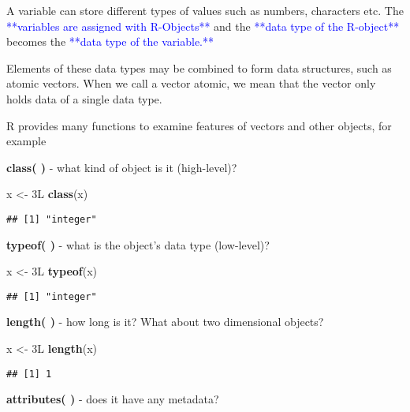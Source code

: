 \documentclass[
]{article}
\newenvironment{Shaded}{\begin{snugshade}}{\end{snugshade}}
\newcommand{\FunctionTok}[1]{\textcolor[rgb]{0.13,0.29,0.53}{\textbf{#1}}}
\newcommand{\NormalTok}[1]{#1}
\newcommand{\OtherTok}[1]{\textcolor[rgb]{0.56,0.35,0.01}{#1}}
\begin{document}
A variable can store different types of values such as numbers,
characters etc. The
\textcolor{blue}{**variables are assigned with R-Objects**} and the
\textcolor{blue}{**data type of the R-object**} becomes the
\textcolor{blue}{**data type of the variable.**}

Elements of these data types may be combined to form data structures,
such as atomic vectors. When we call a vector atomic, we mean that the
vector only holds data of a single data type.

R provides many functions to examine features of vectors and other
objects, for example

\textbf{class( )} - what kind of object is it (high-level)?

\begin{Shaded}
\begin{Highlighting}[]
\NormalTok{x }\OtherTok{\textless{}{-}}\NormalTok{ 3L}
\FunctionTok{class}\NormalTok{(x)}
\end{Highlighting}
\end{Shaded}

\begin{verbatim}
## [1] "integer"
\end{verbatim}

\textbf{typeof( )} - what is the object's data type (low-level)?

\begin{Shaded}
\begin{Highlighting}[]
\NormalTok{x }\OtherTok{\textless{}{-}}\NormalTok{ 3L}
\FunctionTok{typeof}\NormalTok{(x)}
\end{Highlighting}
\end{Shaded}

\begin{verbatim}
## [1] "integer"
\end{verbatim}

\textbf{length( )} - how long is it? What about two dimensional objects?

\begin{Shaded}
\begin{Highlighting}[]
\NormalTok{x }\OtherTok{\textless{}{-}}\NormalTok{ 3L}
\FunctionTok{length}\NormalTok{(x)}
\end{Highlighting}
\end{Shaded}

\begin{verbatim}
## [1] 1
\end{verbatim}

\textbf{attributes( )} - does it have any metadata?
\end{document}
